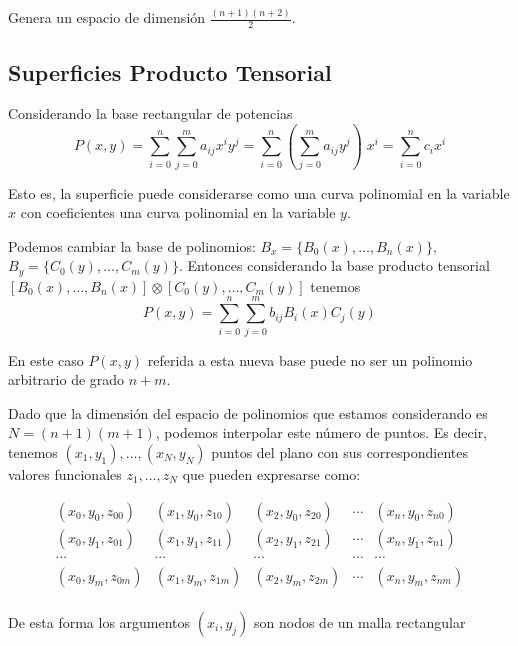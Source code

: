 \documentclass[ebook,oneside]{memoir}
\begin{document}
Genera un espacio de dimensi\'{o}n $\frac{(n+1)(n+2)}{2}.$

\subsection{Superficies Producto Tensorial}

Considerando la base rectangular de potencias
$$P(x,y)=\sum_{i=0}^n \sum_{j=0}^m a_{ij} x^iy^j=\sum_{i=0}^n \left(\sum_{j=0}^m a_{ij}y^j \right) \;x^i=\sum_{i=0}^n c_i x^i$$

Esto es, la superficie puede considerarse como una curva polinomial en la variable $x$ con coeficientes una curva polinomial en la variable $y$.

\vspace{0.2cm}

Podemos cambiar la base de polinomios: $B_x=\{B_0(x),\ldots,B_n(x)\},$ \; $B_y=\{C_0(y),\ldots,C_m(y)\}$. Entonces considerando la base producto tensorial $[B_0(x),\ldots,B_n(x)] \otimes [C_0(y),\ldots,C_m(y)]$ tenemos
$$P(x,y)=\sum_{i=0}^n \sum_{j=0}^m b_{ij} B_i(x) C_j(y)$$

En este caso $P(x,y)$ referida a esta nueva base puede no ser un polinomio arbitrario de grado $n+m$.

Dado que la dimensi\'{o}n del espacio de polinomios que estamos considerando es $N=(n+1)(m+1)$, podemos interpolar este n\'{u}mero de puntos. Es decir, tenemos $(x_1,y_1),\ldots,(x_N,y_N)$ puntos del plano con sus correspondientes valores funcionales $z_1, \ldots,z_N$ que pueden expresarse como:

$$\begin{array}{ccccc}
(x_0,y_0,z_{00}) &(x_1,y_0,z_{10})&(x_2,y_0,z_{20})& \cdots&
(x_n,y_0,z_{n0})\\
(x_0,y_1,z_{01}) &(x_1,y_1,z_{11})&(x_2,y_1,z_{21})& \cdots&
(x_n,y_1,z_{n1})\\
\cdots & \cdots& \cdots& \cdots & \cdots \\
(x_0,y_m,z_{0m}) &(x_1,y_m,z_{1m})&(x_2,y_m,z_{2m})& \cdots&
(x_n,y_m,z_{nm})\\
\end{array}$$

De esta forma los argumentos $(x_i,y_j)$ son nodos de un malla rectangular
\end{document}
